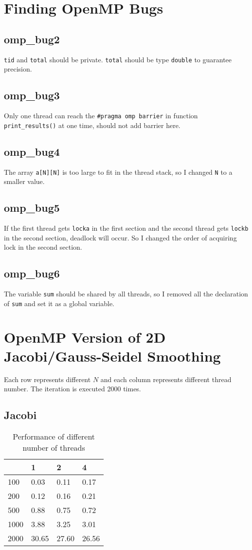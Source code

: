 \documentclass{article}
\begin{document}
\section{Finding OpenMP Bugs}
    \subsection{omp\_bug2}
        \verb|tid| and \verb|total| should be private. \verb|total| should be type \verb|double| to guarantee precision.
    \subsection{omp\_bug3}
        Only one thread can reach the \verb|#pragma omp barrier| in function \verb|print_results()| at one time, should not add barrier here.
    \subsection{omp\_bug4}
        The array \verb|a[N][N]| is too large to fit in the thread stack, so I changed \verb|N| to a smaller value.
    \subsection{omp\_bug5}
        If the first thread gets \verb|locka| in the first section and the second thread gets \verb|lockb| in the second section, deadlock will occur. So I changed the order of acquiring lock in the second section.
    \subsection{omp\_bug6}
        The variable \verb|sum| should be shared by all threads, so I removed all the declaration of \verb|sum| and set it as a global variable.
        
\section{OpenMP Version of 2D Jacobi/Gauss-Seidel Smoothing}
    Each row represents different $N$ and each column represents different thread number. The iteration is executed 2000 times.
    \subsection{Jacobi}
    \begin{table}[htb!]
        \centering
        \begin{tabular}{|l|l|l|l|}
        \hline
         & 1 & 2 & 4 \\ \hline
        100 & 0.03 & 0.11 & 0.17 \\ \hline
        200 & 0.12 & 0.16 & 0.21 \\ \hline
        500 & 0.88 & 0.75 & 0.72 \\ \hline
        1000 & 3.88 & 3.25 & 3.01 \\ \hline
        2000 & 30.65 & 27.60 & 26.56 \\ \hline
        \end{tabular}
        \caption{Performance of different number of threads}
    \end{table}
\end{document}
